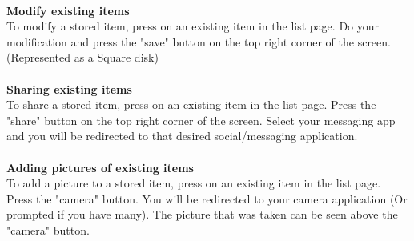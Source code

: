 \documentclass{article}
\begin{document}
\pagebreak\\\textbf{Modify existing items}\\To modify a stored item, press on an existing item in the list page. Do your modification and press the "save" button on the top right corner of the screen. (Represented as a Square disk)\\\\\textbf{Sharing existing items}\\To share a stored item, press on an existing item in the list page. Press the "share" button on the top right corner of the screen. Select your messaging app and you will be redirected to that desired social/messaging application.\\\\\textbf{Adding pictures of existing items}\\To add a picture to a stored item, press on an existing item in the list page. Press the "camera" button. You will be redirected to your camera application (Or prompted if you have many). The picture that was taken can be seen above the "camera" button.



\pagebreak
\end{document}
